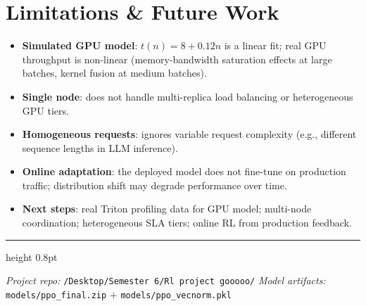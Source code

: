 \documentclass[11pt,a4paper]{article}
\begin{document}
\section{Limitations \& Future Work}

\begin{itemize}[noitemsep]
  \item \textbf{Simulated GPU model}: $t(n) = 8 + 0.12n$ is a linear fit;
        real GPU throughput is non-linear (memory-bandwidth saturation effects
        at large batches, kernel fusion at medium batches).
  \item \textbf{Single node}: does not handle multi-replica load balancing or
        heterogeneous GPU tiers.
  \item \textbf{Homogeneous requests}: ignores variable request complexity
        (e.g., different sequence lengths in LLM inference).
  \item \textbf{Online adaptation}: the deployed model does not fine-tune on
        production traffic; distribution shift may degrade performance over time.
  \item \textbf{Next steps}: real Triton profiling data for GPU model;
        multi-node coordination; heterogeneous SLA tiers; online RL from
        production feedback.
\end{itemize}

\vspace{10pt}
\hrule height 0.8pt
\vspace{4pt}
\begin{center}
  \small\textit{Project repo:}
  \texttt{/Desktop/Semester\,6/Rl\,project\,gooooo/}\quad
  \textit{Model artifacts:} \texttt{models/ppo\_final.zip} +
  \texttt{models/ppo\_vecnorm.pkl}
\end{center}
\end{document}
